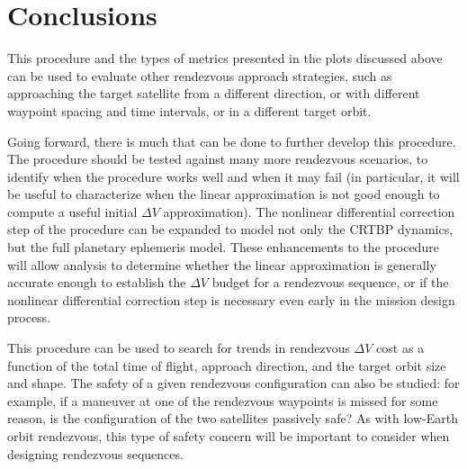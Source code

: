 \documentclass[letterpaper, preprint, paper,11pt]{AAS}	%
\begin{document}
\section{Conclusions}
This procedure and the types of metrics presented in the plots discussed above can be used to evaluate other rendezvous approach strategies, such as approaching the target satellite from a different direction, or with different waypoint spacing and time intervals, or in a different target orbit.

Going forward, there is much that can be done to further develop this procedure. The procedure should be tested against many more rendezvous scenarios, to identify when the procedure works well and when it may fail (in particular, it will be useful to characterize when the linear approximation is not good enough to compute a useful initial \(\Delta V\) approximation). The nonlinear differential correction step of the procedure can be expanded to model not only the CRTBP dynamics, but the full planetary ephemeris model. These enhancements to the procedure will allow analysis to determine whether the linear approximation is generally accurate enough to establish the \(\Delta V\) budget for a rendezvous sequence, or if the nonlinear differential correction step is necessary even early in the mission design process.

This procedure can be used to search for trends in rendezvous \(\Delta V\) cost as a function of the total time of flight, approach direction, and the target orbit size and shape. The safety of a given rendezvous configuration can also be studied: for example, if a maneuver at one of the rendezvous waypoints is missed for some reason, is the configuration of the two satellites passively safe? As with low-Earth orbit rendezvous, this type of safety concern will be important to consider when designing rendezvous sequences.






\end{document}
